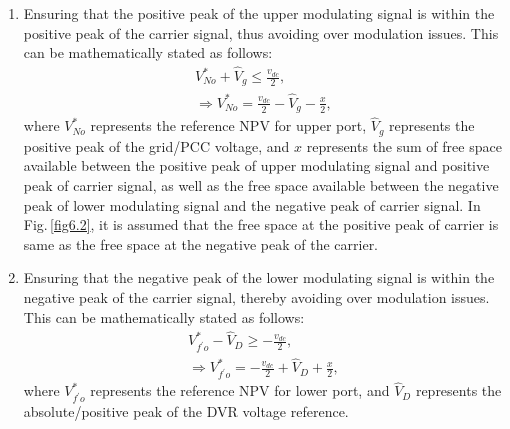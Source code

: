 \begin{enumerate} \vspace*{-0.4cm}
	\item Ensuring that the positive peak of the upper modulating signal is within the positive peak of the carrier signal, thus avoiding over modulation issues. This can be mathematically stated as follows: \vspace*{-0.4cm}
	\begin{equation}  \label{6.3}
	\begin{aligned}
		V^{*}_{No} + \hat{V}_{g} \leq \frac{v_{dc}}{2}, \\
		\Rightarrow V^{*}_{No} = \frac{v_{dc}}{2} - \hat{V}_{g} - \frac{x}{2},
	\end{aligned}
	\end{equation}
	where $V^{*}_{No}$ represents the reference NPV for upper port, $\hat{V}_{g}$ represents the positive peak of the grid/PCC voltage, and $x$ represents the sum of free space available between the positive peak of upper modulating signal and positive peak of carrier signal, as well as the free space available between the negative peak of lower modulating signal and the negative peak of carrier signal. In Fig.\,\ref{fig6.2}, it is assumed that the free space at the positive peak of carrier is same as the free space at the negative peak of the carrier.
	
	\item Ensuring that the negative peak of the lower modulating signal is within the negative peak of the carrier signal, thereby avoiding over modulation issues. This can be mathematically stated as follows:
	\begin{equation}  \label{6.4}
	\begin{aligned}
	V^{*}_{f^{\prime}o} - \hat{V}_{D} \geq -\frac{v_{dc}}{2}, \\
	\Rightarrow V^{*}_{f^{\prime}o} = -\frac{v_{dc}}{2} + \hat{V}_{D} + \frac{x}{2},
	\end{aligned}
	\end{equation}
	where $V^{*}_{f^{\prime}o}$ represents the reference NPV for lower port, and $\hat{V}_{D}$ represents the absolute/positive peak of the DVR voltage reference. 
	

\end{enumerate}
